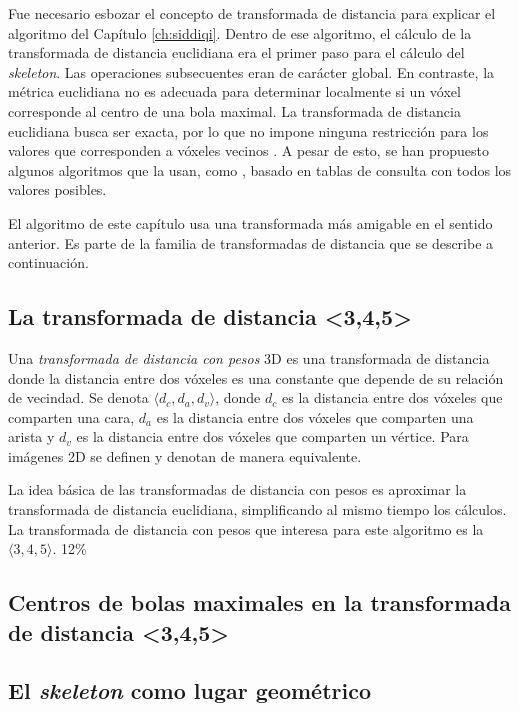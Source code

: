Fue necesario esbozar el concepto de transformada de distancia para explicar el algoritmo del Capítulo \ref{ch:siddiqi}. Dentro de ese algoritmo, el cálculo de la transformada de distancia euclidiana era el primer paso para el cálculo del \textit{skeleton}. Las operaciones subsecuentes eran de carácter global. En contraste, la métrica euclidiana no es adecuada para determinar localmente si un vóxel corresponde al centro de una bola maximal. La transformada de distancia euclidiana busca ser exacta, por lo que no impone ninguna restricción para los valores que corresponden a vóxeles vecinos \cite{borgefors1991euclidean}. A pesar de esto, se han propuesto algunos algoritmos que la usan, como \cite{remy2003look}, basado en tablas de consulta con todos los valores posibles.

El algoritmo de este capítulo usa una transformada más amigable en el sentido anterior. Es parte de la familia de transformadas de distancia que se describe a continuación.

\subsection{La transformada de distancia <3,4,5>}

Una \textit{transformada de distancia con pesos} 3D es una transformada de distancia donde la distancia entre dos vóxeles es una constante que depende de su relación de vecindad. Se denota $\langle d_c,d_a,d_v \rangle$, donde $d_c$ es la distancia entre dos vóxeles que comparten una cara, $d_a$ es la distancia entre dos vóxeles que comparten una arista y $d_v$ es la distancia entre dos vóxeles que comparten un vértice. Para imágenes 2D se definen y denotan de manera equivalente.

La idea básica de las transformadas de distancia con pesos es aproximar la transformada de distancia euclidiana, simplificando al mismo tiempo los cálculos. La transformada de distancia con pesos que interesa para este algoritmo es la $\langle 3,4,5 \rangle$. 12\% 

\subsection{Centros de bolas maximales en la transformada de distancia <3,4,5>}

\subsection{El \textit{skeleton} como lugar geométrico}

